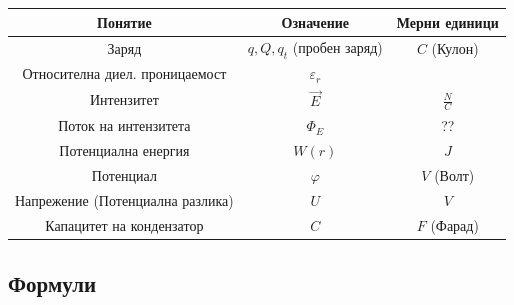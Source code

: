 \documentclass[fleqn, 12pt]{article}
\theoremstyle{definition}
\begin{document}
\begin{center}
\begin{tabular}{ |c|c|c|}
\hline
\textbf{Понятие} &\textbf{Означение} & \textbf{Мерни единици}\\
\hline
Заряд& $q, Q, q_t$ (пробен заряд)& $C$ (Кулон) \\
\hline 
Относителна диел. проницаемост& $\varepsilon_r$& \\
\hline
Интензитет& $\vec{E}$ & $\frac{N}{C}$ \\
\hline
Поток на интензитета & $\Phi_E$ & ?? \\
\hline
Потенциална енергия & $W(r)$ & $J$ \\
\hline
Потенциал & $\varphi$ & $V$ (Волт)\\
\hline
Напрежение (Потенциална разлика) & $U$ & $V$\\
\hline
Капацитет на кондензатор & $C$ & $F$ (Фарад) \\
\hline
\end{tabular}
\end{center}

\newpage
\subsection{Формули}
\end{document}
